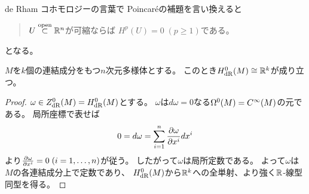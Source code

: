 \documentclass[report]{jlreq}
\begin{document}
\begin{remark}
    de Rham コホモロジーの言葉で Poincar\'{e}の補題を言い換えると
    \begin{quotation}
        $U \stackrel{\text{open}}{\subset} \mathbb{R}^n$が可縮ならば
        $H^p(U) = 0 \; (p \ge 1)$である。
    \end{quotation}
    となる。
\end{remark}

\begin{proposition}
    $M$を$k$個の連結成分をもつ$n$次元多様体とする。
    このとき$H_{\mathrm{dR}}^0(M) \cong \mathbb{R}^k$が成り立つ。
\end{proposition}

\begin{proof}
    $\omega \in Z_{\mathrm{dR}}^0(M) = H_{\mathrm{dR}}^0(M)$とする。
    $\omega$は$d\omega = 0$なる$\Omega^0(M) = C^\infty(M)$の元である。
    局所座標で表せば
    \begin{equation}
        0 = d\omega = \sum_{i = 1}^n \deldel[\omega]{x^i} dx^i
    \end{equation}
    より$\deldel[\omega]{x^i} = 0 \; (i = 1, \dots, n)$が従う。
    したがって$\omega$は局所定数である。
    よって$\omega$は$M$の各連結成分上で定数であり、
    $H_{\mathrm{dR}}^0(M)$から$\mathbb{R}^k$への全単射、より強く$\mathbb{R}$-線型同型を得る。
\end{proof}
\end{document}
